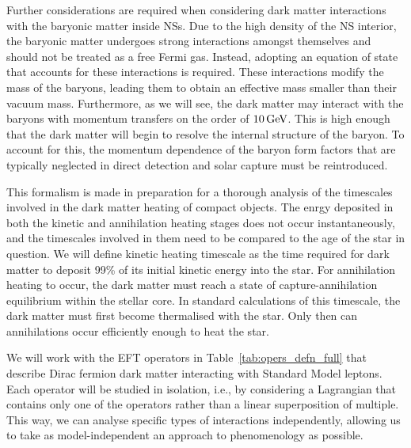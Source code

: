 Further considerations are required when considering dark matter interactions with the baryonic matter inside NSs. Due to the high density of the NS interior, the baryonic matter undergoes strong interactions amongst themselves and should not be treated as a free Fermi gas. Instead, adopting an equation of state that accounts for these interactions is required. These interactions modify the mass of the baryons, leading them to obtain an effective mass smaller than their vacuum mass. Furthermore, as we will see, the dark matter may interact with the baryons with momentum transfers on the order of $10{\rm \,GeV}$. This is high enough that the dark matter will begin to resolve the internal structure of the baryon. To account for this, the momentum dependence of the baryon form factors that are typically neglected in direct detection and solar capture must be reintroduced.

This formalism is made in preparation for a thorough analysis of the timescales involved in the dark matter heating of compact objects. The enrgy deposited in both the kinetic and annihilation heating stages does not occur instantaneously, and the timescales involved in them need to be compared to the age of the star in question. We will define kinetic heating timescale as the time required for dark matter to deposit 99\% of its initial kinetic energy into the star. For annihilation heating to occur, the dark matter must reach a state of capture-annihilation equilibrium within the stellar core. In standard calculations of this timescale, the dark matter must first become thermalised with the star. Only then can annihilations occur efficiently enough to heat the star. 


We will work with the EFT operators in Table~\ref{tab:opers_defn_full} that describe Dirac fermion dark matter interacting with Standard Model leptons. Each operator will be studied in isolation, i.e., by considering a Lagrangian that contains only one of the operators rather than a linear superposition of multiple. This way, we can analyse specific types of interactions independently, allowing us to take as model-independent an approach to phenomenology as possible. 